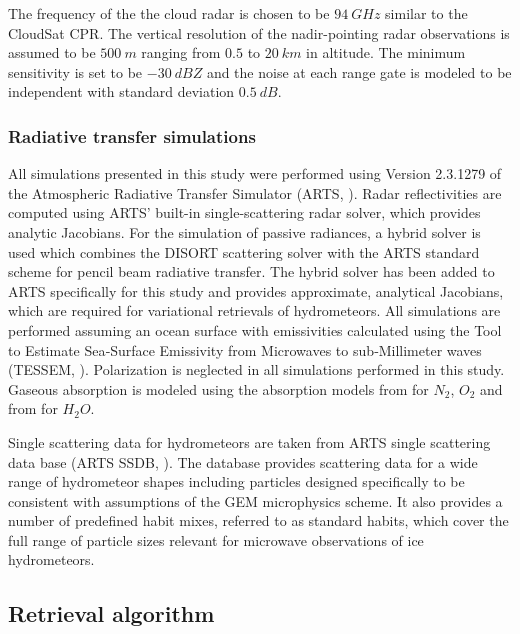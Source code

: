 \documentclass[journal abbreviation, manuscript]{copernicus}
\begin{document}
The frequency of the the cloud radar is chosen to be $94\ \unit{GHz}$ similar to
the CloudSat CPR. The vertical resolution of the nadir-pointing radar
observations is assumed to be $500\ \unit{m}$ ranging from $0.5$ to
$20\ \unit{km}$ in altitude. The minimum sensitivity is set to be
$-30\ \unit{dBZ}$ and the noise at each range gate is modeled to be independent
with standard deviation $0.5\ \unit{dB}$.

\subsubsection{Radiative transfer simulations}
\label{sec:orge741b86}

All simulations presented in this study were performed using Version 2.3.1279 of
the Atmospheric Radiative Transfer Simulator (ARTS, \cite{arts18}). Radar
reflectivities are computed using ARTS' built-in single-scattering radar solver,
which provides analytic Jacobians. For the simulation of passive radiances, a
hybrid solver is used which combines the DISORT \citep{disort00} scattering
solver with the ARTS standard scheme for pencil beam radiative transfer. The
hybrid solver has been added to ARTS specifically for this study and provides
approximate, analytical Jacobians, which are required for  variational
retrievals of hydrometeors. All simulations are performed assuming an ocean
surface with emissivities calculated using the Tool to Estimate Sea‐Surface
Emissivity from Microwaves to sub‐Millimeter waves (TESSEM, \cite{prigent16}).
Polarization is neglected in all simulations performed in this study. Gaseous
absorption is modeled using the absorption models from \cite{rosenkranz93} for
$N_2$, $O_2$ and from \cite{rosenkranz98} for $H_2O$.

Single scattering data for hydrometeors are taken from ARTS single scattering
data base (ARTS SSDB, \citet{eriksson18}). The database provides scattering data
for a wide range of hydrometeor shapes including particles designed specifically
to be consistent with assumptions of the GEM microphysics scheme. It also
provides a number of predefined habit mixes, referred to as standard habits,
which cover the full range of particle sizes relevant for microwave observations
of ice hydrometeors.

\subsection{Retrieval algorithm}
\label{sec:orgb528563}
\end{document}
